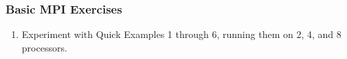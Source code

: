 \begin{frame}
\frametitle{Basic MPI Exercises}
\begin{enumerate}
  \item Experiment with Quick Examples 1 through 6, running them on 2, 4, and 8 processors.
\end{enumerate}
\end{frame}
